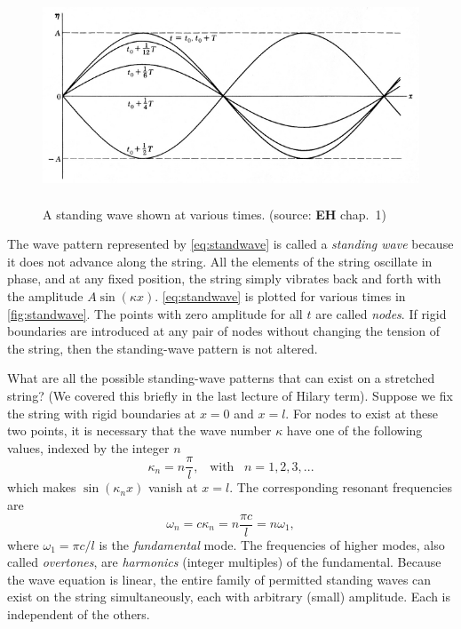\documentclass[11pt,twoside,a4paper]{article}
\begin{document}
\begin{figure}[ht]
  \centering
  \includegraphics[height=2.5in]{../figs/L19/StandingWave}
  \caption{A standing wave shown at various times. (source:
    \textbf{EH} chap.~1)}
  \label{fig:standwave}
\end{figure}

The wave pattern represented by \autoref{eq:standwave} is called a
\textit{standing wave} because it does not advance along the string.
All the elements of the string oscillate in phase, and at any fixed
position, the string simply vibrates back and forth with the amplitude
$A\sin(\kappa x)$.  \autoref{eq:standwave} is plotted for various
times in \autoref{fig:standwave}.  The points with zero amplitude for
all $t$ are called \textit{nodes}.  If rigid boundaries are introduced
at any pair of nodes without changing the tension of the string, then
the standing-wave pattern is not altered.

What are all the possible standing-wave patterns that can exist on a
stretched string? (We covered this briefly in the last lecture of
Hilary term).  Suppose we fix the string with rigid boundaries at
$x=0$ and $x=l$.  For nodes to exist at these two points, it is
necessary that the wave number $\kappa$ have one of the following
values, indexed by the integer $n$
\begin{equation}
  \label{eq:2}
  \kappa_n = n\frac{\pi}{l},\;\;\;\text{with}\;\;\;n=1,2,3,...
\end{equation}
which makes $\sin(\kappa_n x)$ vanish at $x=l$.  The corresponding
resonant frequencies are
\begin{equation}
  \label{eq:4}
  \omega_n = c\kappa_n = n\frac{\pi c}{l} = n\omega_1,
\end{equation}
where $\omega_1 = \pi c/l$ is the \textit{fundamental} mode. The
frequencies of higher modes, also called \textit{overtones}, are
\textit{harmonics} (integer multiples) of the fundamental.  Because
the wave equation is linear, the entire family of permitted standing
waves can exist on the string simultaneously, each with arbitrary
(small) amplitude.  Each is independent of the others.
\end{document}
